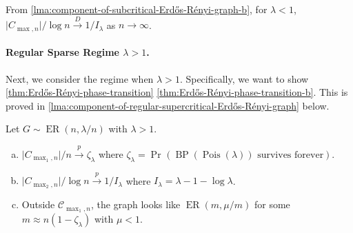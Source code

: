 \begin{note}
	From \autoref{lma:component-of-subcritical-Erdős-Rényi-graph-b}, for \(\lambda < 1\), \(\lvert C_{\max , n} \rvert / \log n \overset{D}{\to} 1 / I_\lambda \) as \(n \to \infty \).
\end{note}

\paragraph{Regular Sparse Regime \(\lambda > 1\).}
Next, we consider the regime when \(\lambda > 1\). Specifically, we want to show \autoref{thm:Erdős-Rényi-phase-transition} \autoref{thm:Erdős-Rényi-phase-transition-b}. This is proved in \autoref{lma:component-of-regular-supercritical-Erdős-Rényi-graph} below.

\begin{lemma}\label{lma:component-of-regular-supercritical-Erdős-Rényi-graph}
	Let \(G \sim \operatorname{ER}(n, \lambda / n) \) with \(\lambda > 1\).
	\begin{enumerate}[(a)]
		\item\label{lma:component-of-regular-supercritical-Erdős-Rényi-graph-a} \(\lvert C_{\max _1, n} \rvert / n \overset{p}{\to} \zeta _\lambda\) where \(\zeta _\lambda = \Pr_{}(\operatorname{BP}(\operatorname{Pois}(\lambda ) ) \text{ survives forever} ) \).
		\item\label{lma:component-of-regular-supercritical-Erdős-Rényi-graph-b} \(\lvert C_{\max _2, n} \rvert / \log n \overset{p}{\to} 1 / I_\lambda \) where \(I_\lambda = \lambda - 1 - \log \lambda \).
		\item\label{lma:component-of-regular-supercritical-Erdős-Rényi-graph-c} Outside \(\mathcal{C} _{\max _1, n}\), the graph looks like \(\operatorname{ER}(m, \mu / m) \) for some \(m \approx n (1 - \zeta _\lambda )\) with \(\mu < 1\).
	\end{enumerate}
\end{lemma}

